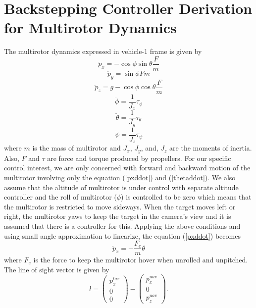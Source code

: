 \section{Backstepping Controller Derivation for Multirotor Dynamics}
The multirotor dynamics expressed in vehicle-1 frame \cite{Beard2008} is given by 
\begin{equation}
\ddot{p}_x=-\cos\phi\sin\theta\frac{F}{m}
\label{pxddot}
\end{equation}
\begin{equation}
\ddot{p}_y=\sin\phi{F}{m}
\end{equation}
\begin{equation}
\ddot{p}_z=g-\cos\phi\cos\theta\frac{F}{m}
\end{equation}
\begin{equation}
\ddot{\phi}=\frac{1}{J_x}\tau_{\phi}
\end{equation}
\begin{equation}
\ddot{\theta}=\frac{1}{J_y}\tau_{\theta}
\label{thetaddot}
\end{equation}
\begin{equation}
\ddot{\psi}=\frac{1}{J_z}\tau_{\psi}
\end{equation}
where $m$ is the mass of multirotor and $J_x$, $J_y$, and, $J_z$ are the moments of inertia. Also, $F$ and $\tau$ are force and torque produced by propellers. For our specific control interest, we are only concerned with forward and backward motion of the multirotor involving only the equation (\ref{pxddot}) and (\ref{thetaddot}). We also assume that the altitude of multirotor is under control with separate altitude controller and the roll of multirotor ($\phi$) is controlled to be zero which means that the multirotor is restricted to move sideways. When the target moves left or right, the multirotor yaws to keep the target in the camera's view and it is assumed that there is a controller for this. Applying the above conditions and using small angle approximation to linearize, the equation (\ref{pxddot}) becomes 
\begin{equation}
\ddot{p}_x=-\frac{F_e}{m}\theta
\end{equation}
where $F_e$ is the force to keep the multirotor hover when unrolled and unpitched. The line of sight vector is given by 
\begin{equation}
l=\begin{pmatrix}
p_x^{tar} \\ 0 \\ 0
\end{pmatrix}
-\begin{pmatrix}
p_x^{uav} \\ 0 \\ p_z^{uav}
\end{pmatrix}.
\label{l}
\end{equation}

